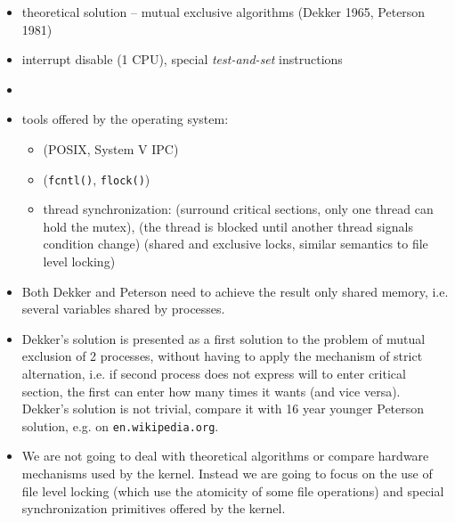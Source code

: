 \begin{slide}
\begin{itemize}
\item theoretical solution -- mutual exclusive algorithms (Dekker
1965, Peterson 1981) 
\item interrupt disable (1 CPU), special \emph{test-and-set} instructions
\item {}
\item tools offered by the operating system:
    \begin{itemize}
    \item {} (POSIX, System V IPC) 
    \item {} (\texttt{fcntl()}, \texttt{flock()}) 
    \item thread synchronization:  (surround critical sections,
    only one thread can hold the mutex), 
    (the thread is blocked until another thread signals condition change)
     (shared and exclusive locks, similar semantics
    to file level locking)
    \end{itemize}
\end{itemize}
\end{slide}

\begin{itemize}
\item Both Dekker and Peterson need to achieve the result only shared memory,
i.e. several variables shared by processes.
\item Dekker's solution is presented as a first solution to the problem of
mutual exclusion of 2 processes, without having to apply the mechanism of
strict alternation, i.e. if second process does not express will to enter
critical section, the first can enter how many times it wants (and vice versa).
Dekker's solution is not trivial, compare it with 16 year younger
Peterson solution, e.g. on \texttt{en.wikipedia.org}.
\item We are not going to deal with theoretical algorithms or compare hardware
mechanisms used by the kernel. Instead we are going to focus on the use of 
file level locking (which use the atomicity of some file operations)
and special synchronization primitives offered by the kernel.
\end{itemize}



